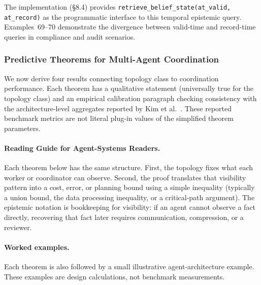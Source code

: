 The implementation (\S8.4) provides \texttt{retrieve\_belief\_state(at\_valid, at\_record)} as the programmatic interface to this temporal epistemic query. Examples~69--70 demonstrate the divergence between valid-time and record-time queries in compliance and audit scenarios.

\subsubsection{Predictive Theorems for Multi-Agent Coordination}

We now derive four results connecting topology class to coordination performance. Each theorem has a qualitative statement (universally true for the topology class) and an empirical calibration paragraph checking consistency with the architecture-level aggregates reported by Kim et al.~\cite{kim2025scaling}. These reported benchmark metrics are not literal plug-in values of the simplified theorem parameters.

\paragraph{Reading Guide for Agent-Systems Readers.}
Each theorem below has the same structure. First, the topology fixes what each worker or coordinator can observe. Second, the proof translates that visibility pattern into a cost, error, or planning bound using a simple inequality (typically a union bound, the data processing inequality, or a critical-path argument). The epistemic notation is bookkeeping for visibility: if an agent cannot observe a fact directly, recovering that fact later requires communication, compression, or a reviewer.

\paragraph{Worked examples.}
Each theorem is also followed by a small illustrative agent-architecture example. These examples are design calculations, not benchmark measurements.

